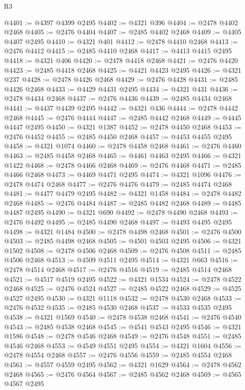 \begin{lexlean}{R3}
\begin{coremodule}
@4401 := @4397 @4399 @2495
@4402 := @4321 @396
@4404 := @2478 @4402 @2468
@4405 := @2476 @4404
@4407 := @2485 @4402 @2468
@4409 := @4405 @4407 @2495
@4410 := @4321 @401
@4412 := @2478 @4410 @2468
@4413 := @2476 @4412
@4415 := @2485 @4410 @2468
@4417 := @4413 @4415 @2495
@4418 := @4321 @406
@4420 := @2478 @4418 @2468
@4421 := @2476 @4420
@4423 := @2485 @4418 @2468
@4425 := @4421 @4423 @2495
@4426 := @4321 @237
@4428 := @2478 @4426 @2468
@4429 := @2476 @4428
@4431 := @2485 @4426 @2468
@4433 := @4429 @4431 @2495
@4434 := @4321 @431
@4436 := @2478 @4434 @2468
@4437 := @2476 @4436
@4439 := @2485 @4434 @2468
@4441 := @4437 @4439 @2495
@4442 := @4321 @436
@4444 := @2478 @4442 @2468
@4445 := @2476 @4444
@4447 := @2485 @4442 @2468
@4449 := @4445 @4447 @2495
@4450 := @4321 @1387
@4452 := @2478 @4450 @2468
@4453 := @2476 @4452
@4455 := @2485 @4450 @2468
@4457 := @4453 @4455 @2495
@4458 := @4321 @1074
@4460 := @2478 @4458 @2468
@4461 := @2476 @4460
@4463 := @2485 @4458 @2468
@4465 := @4461 @4463 @2495
@4466 := @4321 @1422
@4468 := @2478 @4466 @2468
@4469 := @2476 @4468
@4471 := @2485 @4466 @2468
@4473 := @4469 @4471 @2495
@4474 := @4321 @1096
@4476 := @2478 @4474 @2468
@4477 := @2476 @4476
@4479 := @2485 @4474 @2468
@4481 := @4477 @4479 @2495
@4482 := @4321 @1458
@4484 := @2478 @4482 @2468
@4485 := @2476 @4484
@4487 := @2485 @4482 @2468
@4489 := @4485 @4487 @2495
@4490 := @4321 @690
@4492 := @2478 @4490 @2468
@4493 := @2476 @4492
@4495 := @2485 @4490 @2468
@4497 := @4493 @4495 @2495
@4498 := @4321 @1484
@4500 := @2478 @4498 @2468
@4501 := @2476 @4500
@4503 := @2485 @4498 @2468
@4505 := @4501 @4503 @2495
@4506 := @4321 @1502
@4508 := @2478 @4506 @2468
@4509 := @2476 @4508
@4511 := @2485 @4506 @2468
@4513 := @4509 @4511 @2495
@4514 := @4321 @663
@4516 := @2478 @4514 @2468
@4517 := @2476 @4516
@4519 := @2485 @4514 @2468
@4521 := @4517 @4519 @2495
@4522 := @4321 @1534
@4524 := @2478 @4522 @2468
@4525 := @2476 @4524
@4527 := @2485 @4522 @2468
@4529 := @4525 @4527 @2495
@4530 := @4321 @1118
@4532 := @2478 @4530 @2468
@4533 := @2476 @4532
@4535 := @2485 @4530 @2468
@4537 := @4533 @4535 @2495
@4538 := @4321 @1569
@4540 := @2478 @4538 @2468
@4541 := @2476 @4540
@4543 := @2485 @4538 @2468
@4545 := @4541 @4543 @2495
@4546 := @4321 @1586
@4548 := @2478 @4546 @2468
@4549 := @2476 @4548
@4551 := @2485 @4546 @2468
@4553 := @4549 @4551 @2495
@4554 := @4321 @1604
@4556 := @2478 @4554 @2468
@4557 := @2476 @4556
@4559 := @2485 @4554 @2468
@4561 := @4557 @4559 @2495
@4562 := @4321 @1629
@4564 := @2478 @4562 @2468
@4565 := @2476 @4564
@4567 := @2485 @4562 @2468
@4569 := @4565 @4567 @2495

\end{coremodule}
\end{lexlean}
